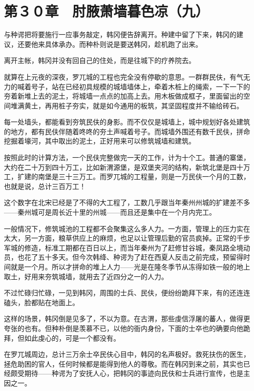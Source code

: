 \section{第３０章　肘腋萧墙暮色凉（九）}

与种谔把将要施行一应事务敲定，韩冈便告辞离开。种建中留了下来，韩冈的建议，还要他来具体承办。而种朴则说是要送韩冈，趁机跑了出来。

离开主帐，韩冈并没有回自己的住处，而是往城下的疗养院去。

就算在上元夜的深夜，罗兀城的工程也完全没有停歇的意思。一群群民伕，有气无力的喊着号子，站在已经初具规模的城墙墙体上，牵着木桩上的绳索，一下一下的夯着新堆上去的泥土，将城墙一点点的加高上去。用木板做成框子，里面留出的空间堆满黄土，再用桩子夯实，就是如今通用的板筑，其坚固程度并不输给砖石。

每一处墙头，都能看到夯筑民伕的身影。而不仅仅是城墙上，城中规划好各处建筑的地方，都有民伕伴随着咚咚的夯土声喊着号子。而城墙外围还有数千民伕，拼命挖掘着壕河，其中取出的泥土，正好用来可以修筑城墙和建筑。

按照此时的计算方法，一个民伕完整做完一天的工作，计为十个工。普通的寨堡，大约在二十万到四十万工，比如新渭源堡，是双堡夹河的结构，新筑北堡是四十万工，扩建的南堡是三十三万工。而罗兀城的工程量，则是一万民伕一个月的工数，也就是说，总计三百万工！

这个数字在北宋已经是了不得的大工程了，工数几乎跟当年秦州州城的扩建差不多——秦州城可是周长近十里的州城——而且还是集中在一个月内完工。

一般情况下，修筑城池的工程都不会聚集这么多人力。一方面，管理上的压力实在太大，另一方面，粮草供应上的麻烦，也足以让管理后勤的官员疯掉。正常的千步军城的修造，标准工期都在百日以上，而当年秦州为了赶修甘谷城，秦凤路全境动员，也花了五十多天。但今次韩绛、种谔为了赶在西夏人反击之前完成，预留得时间就是一个月。所以才拼命的堆上人力——光是在隆冬季节从冻得如铁一般的地上取土，好用来夯筑城墙，就用去了近四分之一的人力。

不过忙碌归忙碌，一见到韩冈，周围的士兵、民伕，便纷纷跪拜下来，有的还连连磕头，脸都贴在地面上。

这样的场景，韩冈倒是见多了，不以为意。在古渭，那些虔信浮屠的蕃人，做得更夸张的也有。但种朴倒是羡慕不已，以他的衙内身份，下面的士卒也的确要向他跪拜，但如此虔心的，可是一个都没有。

在罗兀城周边，总计三万余士卒民伕心目中，韩冈的名声极好。救死扶伤的医生，拯危助困的官人，任何时候都是能得到他人的尊敬。而在韩冈到来之前，其实也已经颇受期待——种谔为了安抚人心，把韩冈的事迹向民伕和士兵进行宣传，也是主因之一。

